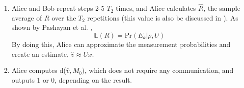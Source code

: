 \documentclass[../3Wworkreport.tex]{subfiles}
\begin{document}
\begin{enumerate}
	\item
		Alice and Bob repeat steps 2-5 $T_2$ times, and Alice calculates $\hat{R}$, the sample average of $R$ over the $T_2$ repetitions (this value is also be discussed in ). As shown by Pashayan et al. \parencite*{Pashayan2014},
		\begin{equation}
			\mathbb{E}(R) = \text{Pr}(E_k| \rho, U)
		\end{equation}
		By doing this, Alice can approximate the measurement probabilities and create an estimate, $\hat{v} \approx Ux$.

	\item
		Alice computes d($\hat{v}, M_0)$, which does not require any communication, and outputs 1 or 0, depending on the result. 
\end{enumerate}
\end{document}
